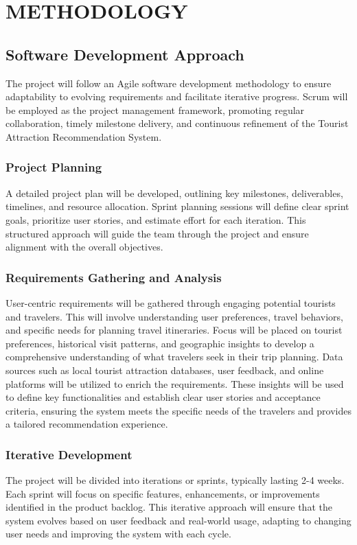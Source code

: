 \chapter{METHODOLOGY}
\section{Software Development Approach}
The project will follow an Agile software development methodology to ensure adaptability to evolving requirements and facilitate iterative progress. Scrum will be employed as the project management framework, promoting regular collaboration, timely milestone delivery, and continuous refinement of the Tourist Attraction Recommendation System.

\subsection{Project Planning}
A detailed project plan will be developed, outlining key milestones, deliverables, timelines, and resource allocation. Sprint planning sessions will define clear sprint goals, prioritize user stories, and estimate effort for each iteration. This structured approach will guide the team through the project and ensure alignment with the overall objectives.

\subsection{Requirements Gathering and Analysis}
User-centric requirements will be gathered through engaging potential tourists and travelers. This will involve understanding user preferences, travel behaviors, and specific needs for planning travel itineraries. Focus will be placed on tourist preferences, historical visit patterns, and geographic insights to develop a comprehensive understanding of what travelers seek in their trip planning. Data sources such as local tourist attraction databases, user feedback, and online platforms will be utilized to enrich the requirements. These insights will be used to define key functionalities and establish clear user stories and acceptance criteria, ensuring the system meets the specific needs of the travelers and provides a tailored recommendation experience.

\subsection{Iterative Development}
The project will be divided into iterations or sprints, typically lasting 2-4 weeks. Each sprint will focus on specific features, enhancements, or improvements identified in the product backlog. This iterative approach will ensure that the system evolves based on user feedback and real-world usage, adapting to changing user needs and improving the system with each cycle.

